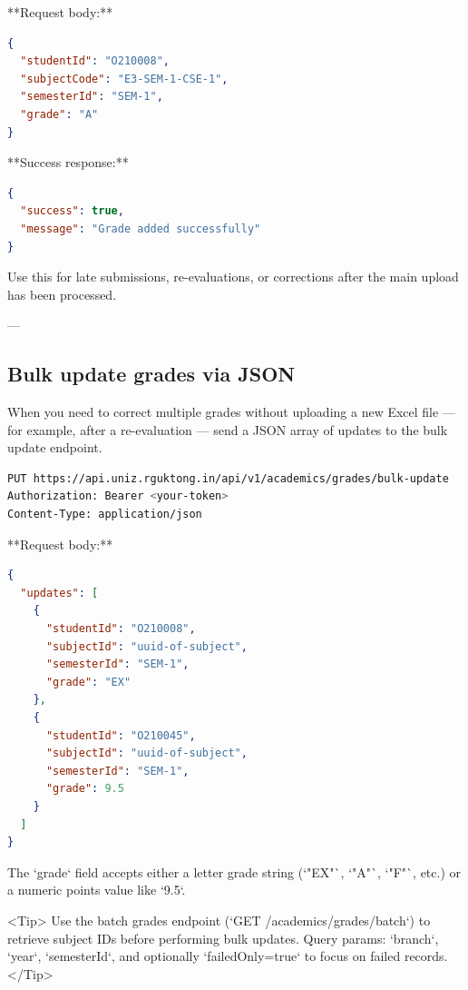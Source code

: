 **Request body:**

\begin{lstlisting}[language=json]
{
  "studentId": "O210008",
  "subjectCode": "E3-SEM-1-CSE-1",
  "semesterId": "SEM-1",
  "grade": "A"
}

\end{lstlisting}

**Success response:**

\begin{lstlisting}[language=json]
{
  "success": true,
  "message": "Grade added successfully"
}

\end{lstlisting}

Use this for late submissions, re-evaluations, or corrections after the main
upload has been processed.

---

\subsection{Bulk update grades via JSON}

When you need to correct multiple grades without uploading a new Excel file —
for example, after a re-evaluation — send a JSON array of updates to the bulk
update endpoint.

\begin{lstlisting}[language=bash]
PUT https://api.uniz.rguktong.in/api/v1/academics/grades/bulk-update
Authorization: Bearer <your-token>
Content-Type: application/json

\end{lstlisting}

**Request body:**

\begin{lstlisting}[language=json]
{
  "updates": [
    {
      "studentId": "O210008",
      "subjectId": "uuid-of-subject",
      "semesterId": "SEM-1",
      "grade": "EX"
    },
    {
      "studentId": "O210045",
      "subjectId": "uuid-of-subject",
      "semesterId": "SEM-1",
      "grade": 9.5
    }
  ]
}

\end{lstlisting}

The `grade` field accepts either a letter grade string (`"EX"`, `"A"`, `"F"`,
etc.) or a numeric points value like `9.5`.

<Tip>
  Use the batch grades endpoint (`GET /academics/grades/batch`) to retrieve
  subject IDs before performing bulk updates. Query params: `branch`, `year`,
  `semesterId`, and optionally `failedOnly=true` to focus on failed records.
</Tip>

